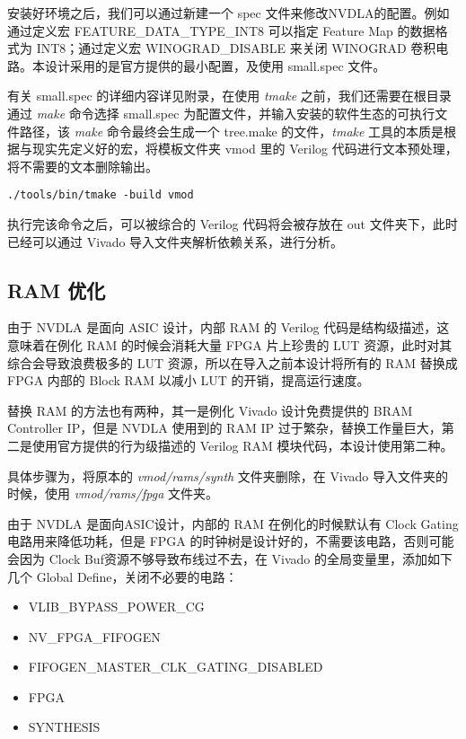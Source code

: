 安装好环境之后，我们可以通过新建一个 spec 文件来修改NVDLA的配置。例如通过定义宏 FEATURE\_DATA\_TYPE\_INT8 可以指定 Feature Map 的数据格式为 INT8；通过定义宏 WINOGRAD\_DISABLE 来关闭 WINOGRAD 卷积电路。本设计采用的是官方提供的最小配置，及使用 small.spec 文件。

有关 small.spec 的详细内容详见附录，在使用 \emph{tmake} 之前，我们还需要在根目录通过 \emph{make} 命令选择 small.spec 为配置文件，并输入安装的软件生态的可执行文件路径，该 \emph{make} 命令最终会生成一个 tree.make 的文件，\emph{tmake} 工具的本质是根据与现实先定义好的宏，将模板文件夹 vmod 里的 Verilog 代码进行文本预处理，将不需要的文本删除输出。

\begin{lstlisting}
./tools/bin/tmake -build vmod
\end{lstlisting}

执行完该命令之后，可以被综合的 Verilog 代码将会被存放在 out 文件夹下，此时已经可以通过 Vivado 导入文件夹解析依赖关系，进行分析。

\subsection{RAM 优化}

由于 NVDLA 是面向 ASIC 设计，内部 RAM 的 Verilog 代码是结构级描述，这意味着在例化 RAM 的时候会消耗大量 FPGA 片上珍贵的 LUT 资源，此时对其综合会导致浪费极多的 LUT 资源，所以在导入之前本设计将所有的 RAM 替换成 FPGA 内部的 Block RAM 以减小 LUT 的开销，提高运行速度。

替换 RAM 的方法也有两种，其一是例化 Vivado 设计免费提供的 BRAM Controller IP，但是 NVDLA 使用到的 RAM IP 过于繁杂，替换工作量巨大，第二是使用官方提供的行为级描述的 Verilog RAM 模块代码，本设计使用第二种。

具体步骤为，将原本的 \emph{vmod/rams/synth} 文件夹删除，在 Vivado 导入文件夹的时候，使用 \emph{vmod/rams/fpga} 文件夹。

由于 NVDLA 是面向ASIC设计，内部的 RAM 在例化的时候默认有 Clock Gating 电路用来降低功耗，但是 FPGA 的时钟树是设计好的，不需要该电路，否则可能会因为 Clock Buf资源不够导致布线过不去，在 Vivado 的全局变量里，添加如下几个 Global Define，关闭不必要的电路：

\begin{itemize}
    \item VLIB\_BYPASS\_POWER\_CG
    \item NV\_FPGA\_FIFOGEN
    \item FIFOGEN\_MASTER\_CLK\_GATING\_DISABLED
    \item FPGA
    \item SYNTHESIS
\end{itemize}

